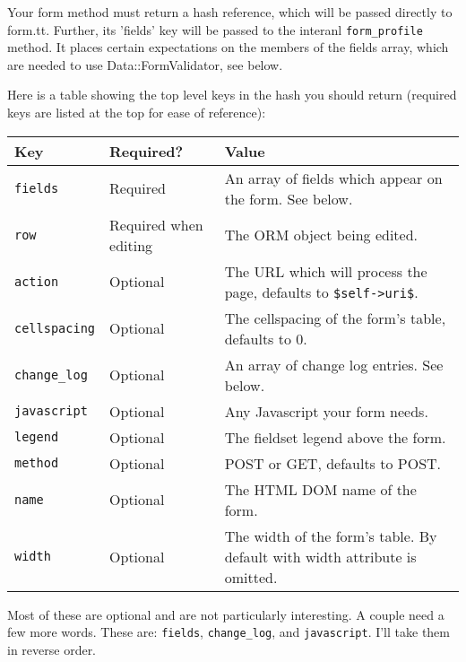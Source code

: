 Your form method must return a hash reference, which will be passed
directly to form.tt.  Further, its 'fields' key will be passed to the
interanl \verb+form_profile+ method.  It places certain expectations on
the members of the fields array, which are needed to use Data::FormValidator,
see below.

Here is a table showing the top level keys in the hash you should return
(required keys are listed at the top for ease of reference):

\begin{tabular}{l|l|l}
Key                & Required?    & Value \\
\hline
\verb+fields+      & Required     & An array of fields which appear on
                                    the form.  See below.               \\
\verb+row+         & Required
                     when editing & The ORM object being edited.        \\
\hline
\verb+action+      & Optional     & The URL which will process the page,
                                    defaults to \verb+$self->uri$+.     \\
\verb+cellspacing+ & Optional     & The cellspacing of the form's table,
                                    defaults to 0.                      \\
\verb+change_log+  & Optional     & An array of change log entries. 
                                    See below.                          \\
\verb+javascript+  & Optional     & Any Javascript your form needs.     \\
\verb+legend+      & Optional     & The fieldset legend above the form. \\
\verb+method+      & Optional     & POST or GET, defaults to POST.      \\
\verb+name+        & Optional     & The HTML DOM name of the form.      \\
\verb+width+       & Optional     & The width of the form's table.
                                    By default with width attribute
                                    is omitted.                         \\
\end{tabular}

Most of these are optional and are not particularly interesting.  A couple
need a few more words.  These are: \verb+fields+, \verb+change_log+,
and \verb+javascript+.  I'll take them in reverse order.

